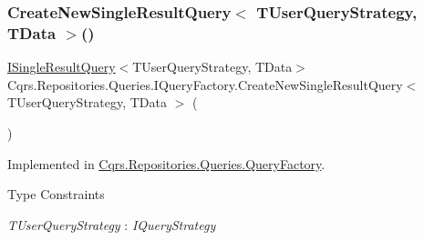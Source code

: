 \subsubsection{\texorpdfstring{Create\+New\+Single\+Result\+Query$<$ T\+User\+Query\+Strategy, T\+Data $>$()}{CreateNewSingleResultQuery< TUserQueryStrategy, TData >()}}
{\footnotesize\ttfamily \hyperlink{interfaceCqrs_1_1Repositories_1_1Queries_1_1ISingleResultQuery}{I\+Single\+Result\+Query}$<$T\+User\+Query\+Strategy, T\+Data$>$ Cqrs.\+Repositories.\+Queries.\+I\+Query\+Factory.\+Create\+New\+Single\+Result\+Query$<$ T\+User\+Query\+Strategy, T\+Data $>$ (\begin{DoxyParamCaption}{ }\end{DoxyParamCaption})}



Implemented in \hyperlink{classCqrs_1_1Repositories_1_1Queries_1_1QueryFactory_aefca41f8cab3f333984b782e7c87f3d1_aefca41f8cab3f333984b782e7c87f3d1}{Cqrs.\+Repositories.\+Queries.\+Query\+Factory}.

\begin{Desc}
\item[Type Constraints]\begin{description}
\item[{\em T\+User\+Query\+Strategy} : {\em I\+Query\+Strategy}]\end{description}
\end{Desc}
